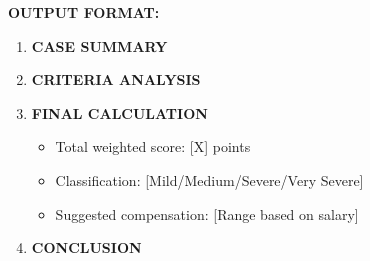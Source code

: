 \documentclass[11pt,a4paper]{article}
\begin{document}
\noindent\textbf{OUTPUT FORMAT:}

\begin{enumerate}
    \item \textbf{CASE SUMMARY} \\
    [Brief description of the facts]
    
    \item \textbf{CRITERIA ANALYSIS} \\
    [For each criterion: analysis, score, and justification]
    
    \item \textbf{FINAL CALCULATION}
    \begin{itemize}
        \item Total weighted score: [X] points
        \item Classification: [Mild/Medium/Severe/Very Severe]
        \item Suggested compensation: [Range based on salary]
    \end{itemize}
    
    \item \textbf{CONCLUSION} \\
    [Summary of analysis and final recommendation]
\end{enumerate}
\end{document}
